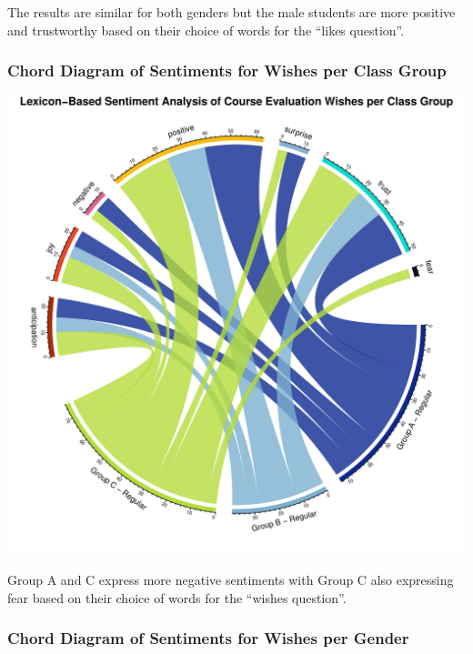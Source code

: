\documentclass[
]{article}
\begin{document}
The results are similar for both genders but the male students are more
positive and trustworthy based on their choice of words for the ``likes
question''.

\newpage

\subsubsection{Chord Diagram of Sentiments for Wishes per Class
Group}\label{chord-diagram-of-sentiments-for-wishes-per-class-group}

\includegraphics{Mid-SemesterCourseEvaluation-20240819-20241125-ADB-BBIT2.2_files/figure-latex/ChordDiagramPerGroup_Wishes-1.pdf}

Group A and C express more negative sentiments with Group C also
expressing fear based on their choice of words for the ``wishes
question''.

\newpage

\subsubsection{Chord Diagram of Sentiments for Wishes per
Gender}\label{chord-diagram-of-sentiments-for-wishes-per-gender}
\end{document}
